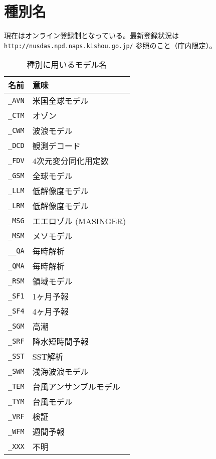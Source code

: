 \section{種別名}
\label{sec:nustype}

現在はオンライン登録制となっている。最新登録状況は
{\tt http://nusdas.npd.naps.kishou.go.jp/} 参照のこと（庁内限定）。

\begin{table}[htp]
\begin{center}
\begin{tabular}{l|l}
\hline
名前 & 意味 \\
\hline
{\tt \_AVN} & 米国全球モデル \\
{\tt \_CTM} & オゾン \\
{\tt \_CWM} & 波浪モデル \\
{\tt \_DCD} & 観測デコード \\
{\tt \_FDV} & 4次元変分同化用定数 \\
{\tt \_GSM} & 全球モデル \\
{\tt \_LLM} & 低解像度モデル \\
{\tt \_LRM} & 低解像度モデル \\
{\tt \_MSG} & エエロゾル (MASINGER) \\
{\tt \_MSM} & メソモデル \\
{\tt \_\_QA} & 毎時解析 \\
{\tt \_QMA} & 毎時解析 \\
{\tt \_RSM} & 領域モデル \\
{\tt \_SF1} & 1ヶ月予報 \\
{\tt \_SF4} & 4ヶ月予報 \\
{\tt \_SGM} & 高潮 \\
{\tt \_SRF} & 降水短時間予報 \\
{\tt \_SST} & SST解析 \\
{\tt \_SWM} & 浅海波浪モデル \\
{\tt \_TEM} & 台風アンサンブルモデル \\
{\tt \_TYM} & 台風モデル \\
{\tt \_VRF} & 検証 \\
{\tt \_WFM} & 週間予報 \\
{\tt \_XXX} & 不明 \\
\hline
\end{tabular}
\caption{種別に用いるモデル名}
\label{tab:model}
\end{center}
\end{table}

